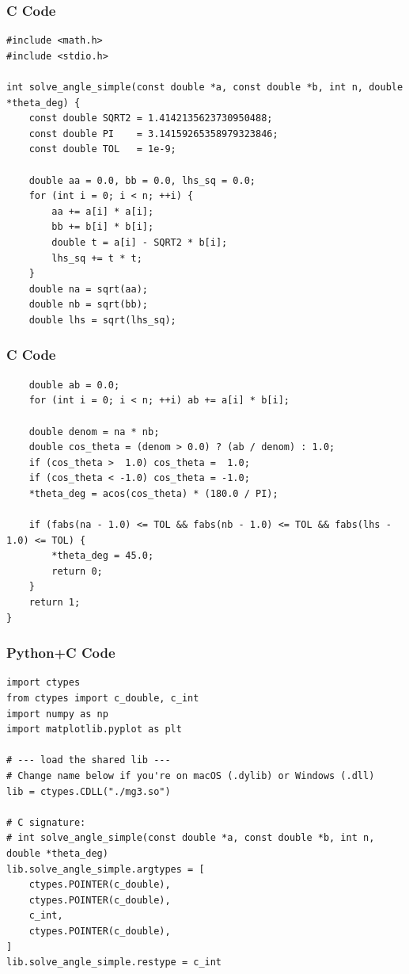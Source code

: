 \documentclass{beamer}
\begin{document}
\begin{frame}[fragile]
    \frametitle{C Code }

    \begin{lstlisting}
#include <math.h>
#include <stdio.h>

int solve_angle_simple(const double *a, const double *b, int n, double *theta_deg) {
    const double SQRT2 = 1.4142135623730950488;
    const double PI    = 3.14159265358979323846;
    const double TOL   = 1e-9;

    double aa = 0.0, bb = 0.0, lhs_sq = 0.0;
    for (int i = 0; i < n; ++i) {
        aa += a[i] * a[i];
        bb += b[i] * b[i];
        double t = a[i] - SQRT2 * b[i];
        lhs_sq += t * t;
    }
    double na = sqrt(aa);
    double nb = sqrt(bb);
    double lhs = sqrt(lhs_sq);
        \end{lstlisting}
\end{frame}
\begin{frame}[fragile]
    \frametitle{C Code }

    \begin{lstlisting}
    double ab = 0.0;
    for (int i = 0; i < n; ++i) ab += a[i] * b[i];

    double denom = na * nb;
    double cos_theta = (denom > 0.0) ? (ab / denom) : 1.0;
    if (cos_theta >  1.0) cos_theta =  1.0;
    if (cos_theta < -1.0) cos_theta = -1.0;
    *theta_deg = acos(cos_theta) * (180.0 / PI);

    if (fabs(na - 1.0) <= TOL && fabs(nb - 1.0) <= TOL && fabs(lhs - 1.0) <= TOL) {
        *theta_deg = 45.0;
        return 0;
    }
    return 1;
}

    \end{lstlisting}
\end{frame}
\begin{frame}[fragile]
    \frametitle{Python+C Code}
    \begin{lstlisting}
import ctypes
from ctypes import c_double, c_int
import numpy as np
import matplotlib.pyplot as plt

# --- load the shared lib ---
# Change name below if you're on macOS (.dylib) or Windows (.dll)
lib = ctypes.CDLL("./mg3.so")

# C signature:
# int solve_angle_simple(const double *a, const double *b, int n, double *theta_deg)
lib.solve_angle_simple.argtypes = [
    ctypes.POINTER(c_double),
    ctypes.POINTER(c_double),
    c_int,
    ctypes.POINTER(c_double),
]
lib.solve_angle_simple.restype = c_int
  \end{lstlisting}
    \end{frame}
\end{document}

